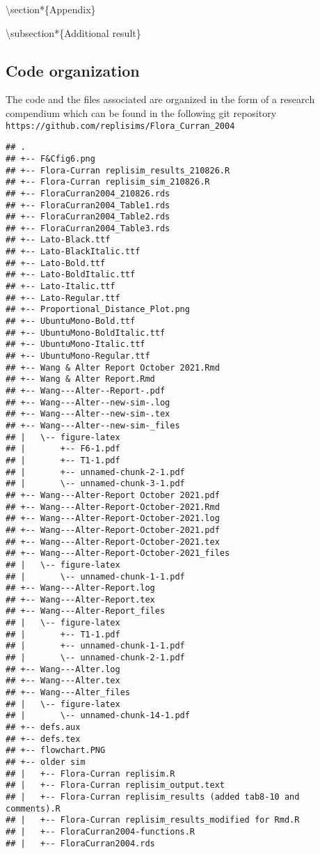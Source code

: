 \documentclass[10,a4paperpaper,]{article}
\begin{document}
\textbackslash section*\{Appendix\}

\textbackslash subsection*\{Additional result\}

\subsection{Code organization}

The code and the files associated are organized in the form of a
research compendium which can be found in the following git repository
\texttt{https://github.com/replisims/Flora\_Curran\_2004}

\begin{verbatim}
## .
## +-- F&Cfig6.png
## +-- Flora-Curran replisim_results_210826.R
## +-- Flora-Curran replisim_sim_210826.R
## +-- FloraCurran2004_210826.rds
## +-- FloraCurran2004_Table1.rds
## +-- FloraCurran2004_Table2.rds
## +-- FloraCurran2004_Table3.rds
## +-- Lato-Black.ttf
## +-- Lato-BlackItalic.ttf
## +-- Lato-Bold.ttf
## +-- Lato-BoldItalic.ttf
## +-- Lato-Italic.ttf
## +-- Lato-Regular.ttf
## +-- Proportional_Distance_Plot.png
## +-- UbuntuMono-Bold.ttf
## +-- UbuntuMono-BoldItalic.ttf
## +-- UbuntuMono-Italic.ttf
## +-- UbuntuMono-Regular.ttf
## +-- Wang & Alter Report October 2021.Rmd
## +-- Wang & Alter Report.Rmd
## +-- Wang---Alter--Report-.pdf
## +-- Wang---Alter--new-sim-.log
## +-- Wang---Alter--new-sim-.tex
## +-- Wang---Alter--new-sim-_files
## |   \-- figure-latex
## |       +-- F6-1.pdf
## |       +-- T1-1.pdf
## |       +-- unnamed-chunk-2-1.pdf
## |       \-- unnamed-chunk-3-1.pdf
## +-- Wang---Alter-Report October 2021.pdf
## +-- Wang---Alter-Report-October-2021.Rmd
## +-- Wang---Alter-Report-October-2021.log
## +-- Wang---Alter-Report-October-2021.pdf
## +-- Wang---Alter-Report-October-2021.tex
## +-- Wang---Alter-Report-October-2021_files
## |   \-- figure-latex
## |       \-- unnamed-chunk-1-1.pdf
## +-- Wang---Alter-Report.log
## +-- Wang---Alter-Report.tex
## +-- Wang---Alter-Report_files
## |   \-- figure-latex
## |       +-- T1-1.pdf
## |       +-- unnamed-chunk-1-1.pdf
## |       \-- unnamed-chunk-2-1.pdf
## +-- Wang---Alter.log
## +-- Wang---Alter.tex
## +-- Wang---Alter_files
## |   \-- figure-latex
## |       \-- unnamed-chunk-14-1.pdf
## +-- defs.aux
## +-- defs.tex
## +-- flowchart.PNG
## +-- older sim
## |   +-- Flora-Curran replisim.R
## |   +-- Flora-Curran replisim_output.text
## |   +-- Flora-Curran replisim_results (added tab8-10 and comments).R
## |   +-- Flora-Curran replisim_results_modified for Rmd.R
## |   +-- FloraCurran2004-functions.R
## |   +-- FloraCurran2004.rds

\end{verbatim}
\end{document}

